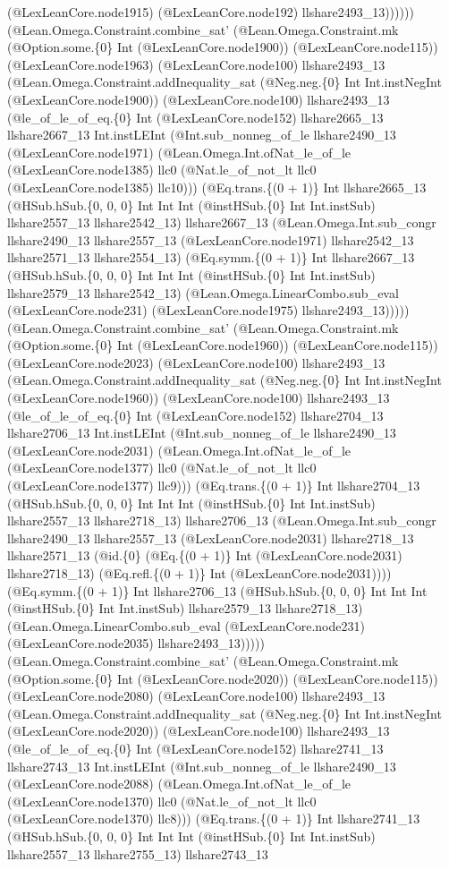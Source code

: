 \documentclass[11pt]{article}
\begin{document}
(@LexLeanCore.node1915) (@LexLeanCore.node192) llshare2493\_13)))))) (@Lean.Omega.Constraint.combine\_sat' (@Lean.Omega.Constraint.mk (@Option.some.\{0\} Int (@LexLeanCore.node1900)) (@LexLeanCore.node115)) (@LexLeanCore.node1963) (@LexLeanCore.node100) llshare2493\_13 (@Lean.Omega.Constraint.addInequality\_sat (@Neg.neg.\{0\} Int Int.instNegInt (@LexLeanCore.node1900)) (@LexLeanCore.node100) llshare2493\_13 (@le\_of\_le\_of\_eq.\{0\} Int (@LexLeanCore.node152) llshare2665\_13 llshare2667\_13 Int.instLEInt (@Int.sub\_nonneg\_of\_le llshare2490\_13 (@LexLeanCore.node1971) (@Lean.Omega.Int.ofNat\_le\_of\_le (@LexLeanCore.node1385) llc0 (@Nat.le\_of\_not\_lt llc0 (@LexLeanCore.node1385) llc10))) (@Eq.trans.\{(0 + 1)\} Int llshare2665\_13 (@HSub.hSub.\{0, 0, 0\} Int Int Int (@instHSub.\{0\} Int Int.instSub) llshare2557\_13 llshare2542\_13) llshare2667\_13 (@Lean.Omega.Int.sub\_congr llshare2490\_13 llshare2557\_13 (@LexLeanCore.node1971) llshare2542\_13 llshare2571\_13 llshare2554\_13) (@Eq.symm.\{(0 + 1)\} Int llshare2667\_13 (@HSub.hSub.\{0, 0, 0\} Int Int Int (@instHSub.\{0\} Int Int.instSub) llshare2579\_13 llshare2542\_13) (@Lean.Omega.LinearCombo.sub\_eval (@LexLeanCore.node231) (@LexLeanCore.node1975) llshare2493\_13))))) (@Lean.Omega.Constraint.combine\_sat' (@Lean.Omega.Constraint.mk (@Option.some.\{0\} Int (@LexLeanCore.node1960)) (@LexLeanCore.node115)) (@LexLeanCore.node2023) (@LexLeanCore.node100) llshare2493\_13 (@Lean.Omega.Constraint.addInequality\_sat (@Neg.neg.\{0\} Int Int.instNegInt (@LexLeanCore.node1960)) (@LexLeanCore.node100) llshare2493\_13 (@le\_of\_le\_of\_eq.\{0\} Int (@LexLeanCore.node152) llshare2704\_13 llshare2706\_13 Int.instLEInt (@Int.sub\_nonneg\_of\_le llshare2490\_13 (@LexLeanCore.node2031) (@Lean.Omega.Int.ofNat\_le\_of\_le (@LexLeanCore.node1377) llc0 (@Nat.le\_of\_not\_lt llc0 (@LexLeanCore.node1377) llc9))) (@Eq.trans.\{(0 + 1)\} Int llshare2704\_13 (@HSub.hSub.\{0, 0, 0\} Int Int Int (@instHSub.\{0\} Int Int.instSub) llshare2557\_13 llshare2718\_13) llshare2706\_13 (@Lean.Omega.Int.sub\_congr llshare2490\_13 llshare2557\_13 (@LexLeanCore.node2031) llshare2718\_13 llshare2571\_13 (@id.\{0\} (@Eq.\{(0 + 1)\} Int (@LexLeanCore.node2031) llshare2718\_13) (@Eq.refl.\{(0 + 1)\} Int (@LexLeanCore.node2031)))) (@Eq.symm.\{(0 + 1)\} Int llshare2706\_13 (@HSub.hSub.\{0, 0, 0\} Int Int Int (@instHSub.\{0\} Int Int.instSub) llshare2579\_13 llshare2718\_13) (@Lean.Omega.LinearCombo.sub\_eval (@LexLeanCore.node231) (@LexLeanCore.node2035) llshare2493\_13))))) (@Lean.Omega.Constraint.combine\_sat' (@Lean.Omega.Constraint.mk (@Option.some.\{0\} Int (@LexLeanCore.node2020)) (@LexLeanCore.node115)) (@LexLeanCore.node2080) (@LexLeanCore.node100) llshare2493\_13 (@Lean.Omega.Constraint.addInequality\_sat (@Neg.neg.\{0\} Int Int.instNegInt (@LexLeanCore.node2020)) (@LexLeanCore.node100) llshare2493\_13 (@le\_of\_le\_of\_eq.\{0\} Int (@LexLeanCore.node152) llshare2741\_13 llshare2743\_13 Int.instLEInt (@Int.sub\_nonneg\_of\_le llshare2490\_13 (@LexLeanCore.node2088) (@Lean.Omega.Int.ofNat\_le\_of\_le (@LexLeanCore.node1370) llc0 (@Nat.le\_of\_not\_lt llc0 (@LexLeanCore.node1370) llc8))) (@Eq.trans.\{(0 + 1)\} Int llshare2741\_13 (@HSub.hSub.\{0, 0, 0\} Int Int Int (@instHSub.\{0\} Int Int.instSub) llshare2557\_13 llshare2755\_13) llshare2743\_13 
\end{document}
